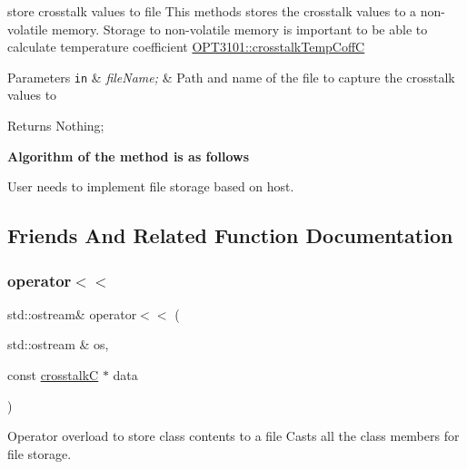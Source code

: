 store crosstalk values to file This methods stores the crosstalk values to a non-\/volatile memory. Storage to non-\/volatile memory is important to be able to calculate temperature coefficient \mbox{\hyperlink{class_o_p_t3101_1_1crosstalk_temp_coff_c}{O\+P\+T3101\+::crosstalk\+Temp\+CoffC}} 


\begin{DoxyParams}[1]{Parameters}
\mbox{\tt in}  & {\em file\+Name;} & Path and name of the file to capture the crosstalk values to \\
\hline
\end{DoxyParams}
\begin{DoxyReturn}{Returns}
Nothing; 
\end{DoxyReturn}
{\bfseries Algorithm of the method is as follows}


\begin{DoxyItemize}
\item User needs to implement file storage based on host. 
\end{DoxyItemize}

\subsection{Friends And Related Function Documentation}
\mbox{\label{class_o_p_t3101_1_1crosstalk_c_a759466b2ca88c3105614f17a571e4d08}} 
\subsubsection{\texorpdfstring{operator$<$$<$}{operator<<}}
{\footnotesize\ttfamily std\+::ostream\& operator$<$$<$ (\begin{DoxyParamCaption}\item[{std\+::ostream \&}]{os,  }\item[{const \mbox{\hyperlink{class_o_p_t3101_1_1crosstalk_c}{crosstalkC}} $\ast$}]{data }\end{DoxyParamCaption})\hspace{0.3cm}{\ttfamily [friend]}}



Operator overload to store class contents to a file Casts all the class members for file storage. 



